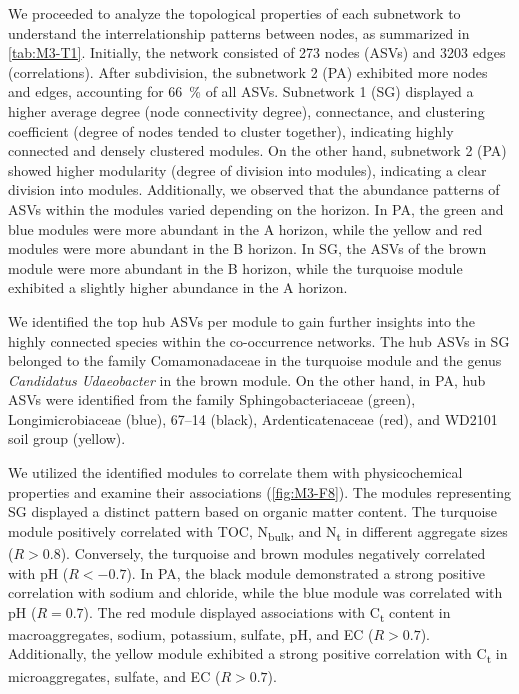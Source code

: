 We proceeded to analyze the topological properties of each subnetwork to understand the interrelationship patterns between nodes, as summarized in \ref{tab:M3-T1}. Initially, the network consisted of 273 nodes (ASVs) and \num{3203} edges (correlations). After subdivision, the subnetwork 2 (PA) exhibited more nodes and edges, accounting for \SI{66}{\percent} of all ASVs. Subnetwork 1 (SG) displayed a higher average degree (node connectivity degree), connectance, and clustering coefficient (degree of nodes tended to cluster together), indicating highly connected and densely clustered modules. On the other hand, subnetwork 2 (PA) showed higher modularity (degree of division into modules), indicating a clear division into modules. Additionally, we observed that the abundance patterns of ASVs within the modules varied depending on the horizon. In PA, the green and blue modules were more abundant in the A horizon, while the yellow and red modules were more abundant in the B horizon. In SG, the ASVs of the brown module were more abundant in the B horizon, while the turquoise module exhibited a slightly higher abundance in the A horizon.

We identified the top hub ASVs per module to gain further insights into the highly connected species within the co-occurrence networks. The hub ASVs in SG belonged to the family Comamonadaceae in the turquoise module and the genus \textit{Candidatus Udaeobacter} in the brown module. On the other hand, in PA, hub ASVs were identified from the family Sphingobacteriaceae (green), Longimicrobiaceae (blue), 67–14 (black), Ardenticatenaceae (red), and WD2101 soil group (yellow).

We utilized the identified modules to correlate them with physicochemical properties and examine their associations (\ref{fig:M3-F8}). The modules representing SG displayed a distinct pattern based on organic matter content. The turquoise module positively correlated with TOC, N\textsubscript{bulk}, and N\textsubscript{t} in different aggregate sizes (\(R > 0.8\)). Conversely, the turquoise and brown modules negatively correlated with pH (\(R < -0.7\)). In PA, the black module demonstrated a strong positive correlation with sodium and chloride, while the blue module was correlated with pH (\(R=0.7\)). The red module displayed associations with C\textsubscript{t} content in macroaggregates, sodium, potassium, sulfate, pH, and EC (\(R > 0.7\)). Additionally, the yellow module exhibited a strong positive correlation with C\textsubscript{t} in microaggregates, sulfate, and EC (\(R > 0.7\)).

